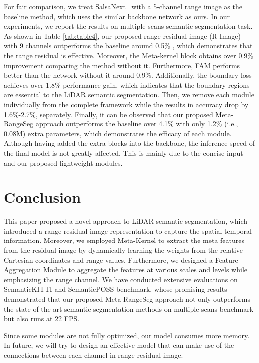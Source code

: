 \documentclass[letterpaper, 10 pt, journal, twoside]{ieeetran}
\begin{document}
For fair comparison, we treat SalsaNext~\cite{cortinhal2020salsanext} with a 5-channel range image as the baseline method, which uses the similar backbone network as ours. In our experiments, we report the results on multiple scans semantic segmentation task. As shown in Table \ref{tab:table4}, our proposed range residual image (R Image) with 9 channels outperforms the baseline around 0.5\% , which demonstrates that the range residual is effective. Moreover, the Meta-kernel block obtains over 0.9\% improvement comparing the method without it. Furthermore, FAM performs better than the network without it around 0.9\%. Additionally, the boundary loss achieves over 1.8\% performance gain, which indicates that the boundary regions are essential to the LiDAR semantic segmentation. 
Then, we remove each module individually from the complete framework while the results in accuracy drop by 1.6\%-2.7\%, separately.
Finally, it can be observed that our proposed Meta-RangeSeg approach outperforms the baseline over 4.1\% with only 1.2\% (i.e., 0.08M) extra parameters, which demonstrates the efficacy of each module.  
Although having added the extra blocks into the backbone, the inference speed of the final model is not greatly affected. This is mainly due to the concise input and our proposed lightweight modules.






\section{Conclusion}
\label{sec:conclusion}

This paper proposed a novel approach to LiDAR semantic segmentation, which introduced a range residual image representation to capture the spatial-temporal information. Moreover, we employed Meta-Kernel to extract the meta features from the residual image by dynamically learning the weights from the relative Cartesian coordinates and range values. Furthermore, we designed a Feature Aggregation Module to aggregate the features at various scales and levels while emphasizing the range channel. We have conducted extensive evaluations on SemanticKITTI and SemanticPOSS benchmark, whose promising results demonstrated that our proposed Meta-RangeSeg approach not only outperforms the state-of-the-art semantic segmentation methods on multiple scans benchmark but also runs at 22 FPS. 

Since some modules are not fully optimized, our model consumes more memory. In future, we will try to design an effective model that can make use of the connections between each channel in range residual image.







\end{document}
